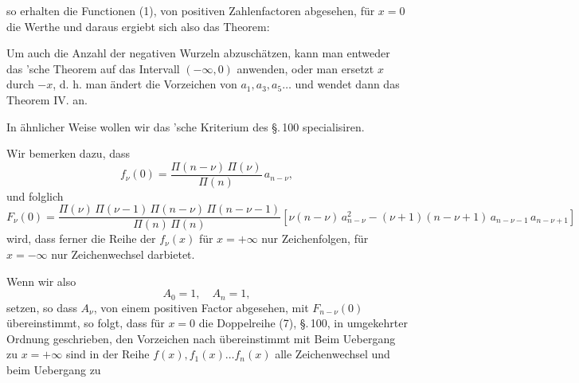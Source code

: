 so erhalten die Functionen (1), von positiven Zahlenfactoren abgesehen, für $x = 0$ die Werthe
und daraus ergiebt sich also das Theorem:


Um auch die Anzahl der negativen Wurzeln abzuschätzen, kann man entweder das 'sche Theorem auf das Intervall $(-\infty, 0)$ anwenden, oder man ersetzt $x$ durch $-x$, d. h. man ändert die Vorzeichen von $a_1, a_3, a_5 \ldots$ und wendet dann das Theorem IV. an.

In ähnlicher Weise wollen wir das 'sche Kriterium des \S.\,100 specialisiren.

Wir bemerken dazu, dass
\[
f_\nu(0) = \frac{\Pi(n-\nu)\,\Pi(\nu)}{\Pi(n)}\, a_{n-\nu},
\]
und folglich
\[
F_\nu(0) = \frac{\Pi(\nu)\,\Pi(\nu-1)\,\Pi(n-\nu)\,\Pi(n-\nu-1)}{\Pi(n)\,\Pi(n)}\left[\nu(n-\nu)\,a_{n-\nu}^2 - (\nu+1)(n-\nu+1)\,a_{n-\nu-1}\,a_{n-\nu+1}\right]
\]
wird, dass ferner die Reihe der $f_\nu(x)$ für $x = +\infty$ nur Zeichenfolgen, für $x = -\infty$ nur Zeichenwechsel darbietet.

Wenn wir also
\[
A_0 = 1, \quad A_n = 1,
\]
setzen, so dass $A_\nu$, von einem positiven Factor abgesehen, mit $F_{n-\nu}(0)$ übereinstimmt, so folgt, dass für $x = 0$ die Doppelreihe (7), \S.\,100, in umgekehrter Ordnung geschrieben, den Vorzeichen nach übereinstimmt mit
Beim Uebergang zu $x = +\infty$ sind in der Reihe $f(x), f_1(x) \ldots f_n(x)$ alle Zeichenwechsel und beim Uebergang zu
